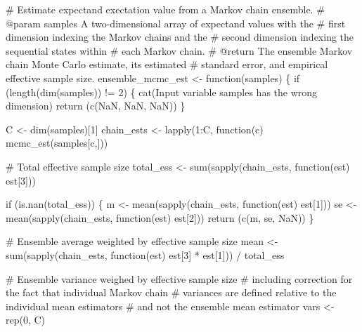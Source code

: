 \documentclass[
  letterpaper,
  DIV=11,
  numbers=noendperiod]{scrartcl}
\newenvironment{Shaded}{\begin{snugshade}}{\end{snugshade}}
\newcommand{\BuiltInTok}[1]{\textcolor[rgb]{0.00,0.23,0.31}{#1}}
\newcommand{\CommentTok}[1]{\textcolor[rgb]{0.37,0.37,0.37}{#1}}
\newcommand{\ControlFlowTok}[1]{\textcolor[rgb]{0.00,0.23,0.31}{#1}}
\newcommand{\DecValTok}[1]{\textcolor[rgb]{0.68,0.00,0.00}{#1}}
\newcommand{\KeywordTok}[1]{\textcolor[rgb]{0.00,0.23,0.31}{#1}}
\newcommand{\NormalTok}[1]{\textcolor[rgb]{0.00,0.23,0.31}{#1}}
\newcommand{\OperatorTok}[1]{\textcolor[rgb]{0.37,0.37,0.37}{#1}}
\newcommand{\StringTok}[1]{\textcolor[rgb]{0.13,0.47,0.30}{#1}}
\begin{document}
\begin{Shaded}
\begin{Highlighting}[]
\CommentTok{\# Estimate expectand exectation value from a Markov chain ensemble.}
\CommentTok{\# @param samples A two{-}dimensional array of expectand values with the }
\CommentTok{\#                first dimension indexing the Markov chains and the }
\CommentTok{\#                second dimension indexing the sequential states within }
\CommentTok{\#                each Markov chain.}
\CommentTok{\# @return The ensemble Markov chain Monte Carlo estimate, its estimated}
\CommentTok{\#         standard error, and empirical effective sample size.}
\NormalTok{ensemble\_mcmc\_est }\OperatorTok{\textless{}{-}}\NormalTok{ function(samples) \{}
  \ControlFlowTok{if}\NormalTok{ (length(dim(samples)) }\OperatorTok{!=} \DecValTok{2}\NormalTok{) \{}
\NormalTok{    cat(}\StringTok{\textquotesingle{}Input variable \textasciigrave{}samples\textasciigrave{} has the wrong dimension\textquotesingle{}}\NormalTok{)}
    \ControlFlowTok{return}\NormalTok{ (c(NaN, NaN, NaN))}
\NormalTok{  \}}
  
\NormalTok{  C }\OperatorTok{\textless{}{-}}\NormalTok{ dim(samples)[}\DecValTok{1}\NormalTok{]}
\NormalTok{  chain\_ests }\OperatorTok{\textless{}{-}}\NormalTok{ lapply(}\DecValTok{1}\NormalTok{:C, function(c) mcmc\_est(samples[c,]))}
  
  \CommentTok{\# Total effective sample size}
\NormalTok{  total\_ess }\OperatorTok{\textless{}{-}} \BuiltInTok{sum}\NormalTok{(sapply(chain\_ests, function(est) est[}\DecValTok{3}\NormalTok{]))}
  
  \ControlFlowTok{if}\NormalTok{ (}\KeywordTok{is}\NormalTok{.nan(total\_ess)) \{}
\NormalTok{    m }\OperatorTok{\textless{}{-}}\NormalTok{ mean(sapply(chain\_ests, function(est) est[}\DecValTok{1}\NormalTok{]))}
\NormalTok{    se }\OperatorTok{\textless{}{-}}\NormalTok{ mean(sapply(chain\_ests, function(est) est[}\DecValTok{2}\NormalTok{]))}
    \ControlFlowTok{return}\NormalTok{ (c(m, se, NaN))}
\NormalTok{  \}}
  
  \CommentTok{\# Ensemble average weighted by effective sample size}
\NormalTok{  mean }\OperatorTok{\textless{}{-}} \BuiltInTok{sum}\NormalTok{(sapply(chain\_ests,}
\NormalTok{                     function(est) est[}\DecValTok{3}\NormalTok{] }\OperatorTok{*}\NormalTok{ est[}\DecValTok{1}\NormalTok{])) }\OperatorTok{/}\NormalTok{ total\_ess}
  
  \CommentTok{\# Ensemble variance weighed by effective sample size}
  \CommentTok{\# including correction for the fact that individual Markov chain}
  \CommentTok{\# variances are defined relative to the individual mean estimators}
  \CommentTok{\# and not the ensemble mean estimator}
  \BuiltInTok{vars} \OperatorTok{\textless{}{-}}\NormalTok{ rep(}\DecValTok{0}\NormalTok{, C)}
  

\end{Highlighting}
\end{Shaded}
\end{document}
